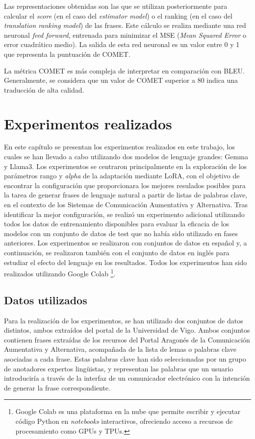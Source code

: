 \documentclass[11pt,spanish,listoffigures,listoftables]{tfgetsinf}
\begin{document}
Las representaciones obtenidas son las que se utilizan posteriormente para calcular el \textit{score} (en el caso del \textit{estimator model}) o el ranking (en el caso del \textit{translation ranking model}) de las frases. Este cálculo se realiza mediante una red neuronal \textit{feed forward}, entrenada para minimizar el MSE (\textit{Mean Squared Error} o error cuadrático medio). La salida de esta red neuronal es un valor entre 0 y 1 que representa la puntuación de COMET.

La métrica COMET es más compleja de interpretar en comparación con BLEU. Generalmente, se considera que un valor de COMET superior a 80 indica una traducción de alta calidad.

\chapter{Experimentos realizados} \label{cap4}

En este capítulo se presentan los experimentos realizados en este trabajo, los cuales se han llevado a cabo utilizando dos modelos de lenguaje grandes: Gemma y Llama3. Los experimentos se centraron principalmente en la exploración de los parámetros rango y \textit{alpha} de la adaptación mediante LoRA, con el objetivo de encontrar la configuración que proporcionara los mejores resulados posibles para la tarea de generar frases de lenguaje natural a partir de listas de palabras clave, en el contexto de los Sistemas de Comunicación Aumentativa y Alternativa. Tras identificar la mejor configuración, se realizó un experimento adicional utilizando todos los datos de entrenamiento disponibles para evaluar la eficacia de los modelos con un conjunto de datos de test que no había sido utilizado en fases anteriores. Los experimentos se realizaron con conjuntos de datos en español y, a continuación, se realizaron también con el conjunto de datos en inglés para estudiar el efecto del lenguaje en los resultados. Todos los experimentos han sido realizados utilizando Google Colab \footnote{Google Colab es una plataforma  en la nube que permite escribir y ejecutar código Python en \textit{notebooks} interactivos, ofreciendo acceso a recursos de procesamiento como GPUs y TPUs.}.

\section{Datos utilizados}

Para la realización de los experimentos, se han utilizado dos conjuntos de datos distintos, ambos extraídos del portal de la Universidad de Vigo. Ambos conjuntos contienen frases extraídas de los recursos del Portal Aragonés de la Comunicación Aumentativa y Alternativa, acompañada de la lista de lemas o palabras clave asociadas a cada frase. Estas palabras clave han sido seleccionadas por un grupo de anotadores expertos lingüistas, y representan las palabras que un usuario introduciría a través de la interfaz de un comunicador electrónico con la intención de generar la frase correspondiente.
\end{document}
